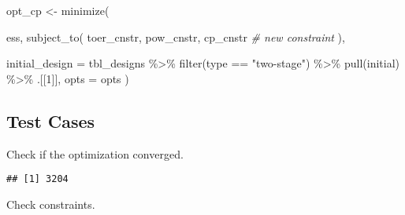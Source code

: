 \documentclass[
]{book}
\newenvironment{Shaded}{\begin{snugshade}}{\end{snugshade}}
\newcommand{\AttributeTok}[1]{\textcolor[rgb]{0.77,0.63,0.00}{#1}}
\newcommand{\CommentTok}[1]{\textcolor[rgb]{0.56,0.35,0.01}{\textit{#1}}}
\newcommand{\DecValTok}[1]{\textcolor[rgb]{0.00,0.00,0.81}{#1}}
\newcommand{\FunctionTok}[1]{\textcolor[rgb]{0.00,0.00,0.00}{#1}}
\newcommand{\NormalTok}[1]{#1}
\newcommand{\OtherTok}[1]{\textcolor[rgb]{0.56,0.35,0.01}{#1}}
\newcommand{\SpecialCharTok}[1]{\textcolor[rgb]{0.00,0.00,0.00}{#1}}
\newcommand{\StringTok}[1]{\textcolor[rgb]{0.31,0.60,0.02}{#1}}
\begin{document}
\begin{Shaded}
\begin{Highlighting}[]
\NormalTok{opt\_cp }\OtherTok{\textless{}{-}} \FunctionTok{minimize}\NormalTok{(}
      
\NormalTok{    ess,}
    \FunctionTok{subject\_to}\NormalTok{(}
\NormalTok{        toer\_cnstr,}
\NormalTok{        pow\_cnstr,}
\NormalTok{        cp\_cnstr }\CommentTok{\# new constraint}
\NormalTok{    ),}

    \AttributeTok{initial\_design =}\NormalTok{ tbl\_designs }\SpecialCharTok{\%\textgreater{}\%} 
        \FunctionTok{filter}\NormalTok{(type }\SpecialCharTok{==} \StringTok{"two{-}stage"}\NormalTok{) }\SpecialCharTok{\%\textgreater{}\%} 
        \FunctionTok{pull}\NormalTok{(initial) }\SpecialCharTok{\%\textgreater{}\%} 
\NormalTok{        .[[}\DecValTok{1}\NormalTok{]],}
    \AttributeTok{opts =}\NormalTok{ opts )}
\end{Highlighting}
\end{Shaded}

\hypertarget{test-cases-16}{%
\subsection{Test Cases}\label{test-cases-16}}

Check if the optimization converged.

\begin{Shaded}
\end{Shaded}

\begin{verbatim}
## [1] 3204
\end{verbatim}

Check constraints.
\end{document}
